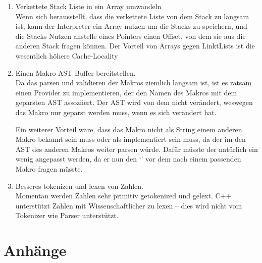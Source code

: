 {\begin{enumerate}[ref=\autoref{ssec:Ausblick}: Punkt \arabic*]
        Dies hätte zur Folge, dass der Nutzer mehr Fehler auf einmal beseitigen kann.
      \item Verkettete Stack Liste in ein Array umwandeln\label{enum:linkedlist}\\
        Wenn sich herausstellt, dass die verkettete Liste von dem Stack zu langsam ist, kann der Interpreter ein Array nutzen um die Stacks zu speichern, und die Stacks Nutzen anstelle eines Pointers einen Offset, von dem sie aus die anderen Stack fragen können. Der Vorteil von Arrays gegen LinktLists ist die wesentlich höhere Cache-Locality
      \item Einen Makro AST Buffer bereitstellen.\label{enum:astbuffer}\\
        Da das parsen und validieren der Makros ziemlich langsam ist, ist es ratsam einen Provider zu implementieren, der den Namen des Makros mit dem geparsten AST assoziiert. Der AST wird von dem  nicht verändert, weswegen das Makro nur geparst werden muss, wenn es sich verändert hat.

        Ein weiterer Vorteil wäre, dass das Makro nicht als String einem anderen Makro bekannt sein muss oder als  implementiert sein muss, da der  im den AST des anderen Makros weiter parsen würde. Dafür müsste der  natürlich ein wenig angepasst werden, da er nun den `' vor dem  nach einem passenden Makro fragen müsste.
      \item Besseres tokenizen und lexen von Zahlen.\label{enum:lexnumber}\\
        Momentan werden Zahlen sehr primitiv getokenized und gelext. C++ unterstützt Zahlen mit Wissenschaftlicher zu lexen -- dies wird nicht vom Tokenizer wie Parser unterstützt.
    \end{enumerate}



\begingroup
\sloppy
\printbibliography
\endgroup
\listoffigures
\listofmyCodeEnvTypes
{} %


\section*{Anhänge}
\label{sec:Anhänge}



